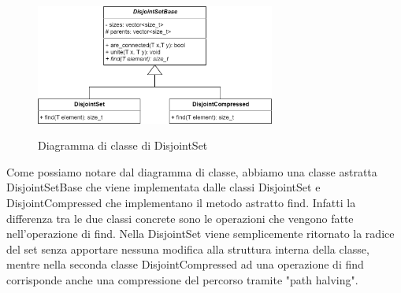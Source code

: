 \begin{figure}[h]
	\caption{Diagramma di classe di DisjointSet}
	\centering
	\includegraphics[width=0.7\textwidth]{./images/DisjointSetClass.png}
	\label{fig:DisjointSet Class}
\end{figure}

Come possiamo notare dal diagramma di classe, abbiamo una classe astratta DisjointSetBase che viene implementata dalle classi DisjointSet e DisjointCompressed che implementano il metodo astratto find. Infatti la differenza tra le due classi concrete sono le operazioni che vengono fatte nell'operazione di find. Nella DisjointSet viene semplicemente ritornato la radice del set senza apportare nessuna modifica alla struttura interna della classe, mentre nella seconda classe DisjointCompressed ad una operazione di find corrisponde anche una compressione del percorso tramite "path halving".


